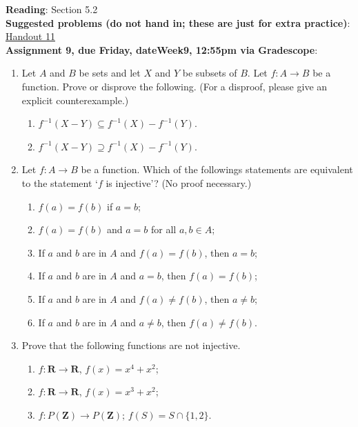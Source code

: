 \documentclass[12pt]{article}
\newcommand{\HWdueTime}{12:55pm }
\begin{document}
\noindent \textbf{Reading}: Section 5.2
\\

\noindent \textbf{Suggested problems (do not hand in; these are just for extra practice)}:
\href{https://www.math.emory.edu/~dzb/teaching/250Fall2021/handouts/250-H11-injectivity.pdf}{Handout 11}
\\


\noindent \textbf{Assignment 9, due Friday, \csname dateWeek9\endcsname, \HWdueTime via Gradescope}:
\begin{enumerate}
\item Let $A$ and $B$ be sets and let $X$ and $Y$ be subsets of $B$. Let $f\colon A \to B$ be a function. Prove or disprove the following. (For a disproof, please give an explicit counterexample.)
 \begin{enumerate}
 \item $f^{-1}(X - Y) \subseteq f^{-1}(X) - f^{-1}(Y)$.
 \item $f^{-1}(X - Y) \supseteq f^{-1}(X) - f^{-1}(Y)$.
 \end{enumerate} 

\item Let $f \colon A \to B$ be a function. Which of the followings statements are equivalent to the statement `$f$ is injective'? (No proof necessary.)
 \begin{enumerate}
 \item $f(a) = f(b)$ if $a = b$;
 \item $f(a) = f(b)$ and $a = b$ for all $a,b \in A$;
 \item If $a$ and $b$ are in $A$ and $f(a) = f(b)$, then $a = b$;
 \item If $a$ and $b$ are in $A$ and $a = b$, then $f(a) = f(b)$;
 \item If $a$ and $b$ are in $A$ and $f(a) \neq f(b)$, then $a \neq b$;
 \item If $a$ and $b$ are in $A$ and $a \neq b$, then $f(a) \neq f(b)$. 
 \end{enumerate}
 
\item Prove that the following functions are not injective. 

\begin{enumerate}
 \item $f \colon \mathbf{R}\to \mathbf{R}$, $f(x) = x^4 + x^2$;
 \item $f \colon \mathbf{R}\to \mathbf{R}$, $f(x) = x^3 + x^2$;
 \item $f \colon P(\mathbf{Z}) \to P(\mathbf{Z});\, f(S) = S \cap \{1,2\}$.


\end{enumerate}
\end{enumerate}
\end{document}
